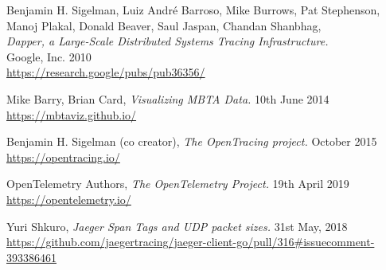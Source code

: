\documentclass[12pt,pdftex,titlepage]{report}
\begin{document}
    \begin{thebibliography}{69}

        Benjamin H. Sigelman, Luiz André Barroso, Mike Burrows, Pat Stephenson, Manoj Plakal, Donald Beaver, Saul Jaspan, Chandan Shanbhag, \\
        \textit{Dapper, a Large-Scale Distributed Systems Tracing Infrastructure.} \\
        Google, Inc. 2010 \\
        \url{https://research.google/pubs/pub36356/}

        Mike Barry, Brian Card, \textit{Visualizing MBTA Data.}
        10th June 2014 \\
        \url{https://mbtaviz.github.io/}

        Benjamin H. Sigelman (co creator), \textit{The OpenTracing project.}
        October 2015 \\
        \url{https://opentracing.io/}

        OpenTelemetry Authors, \textit{The OpenTelemetry Project.} 
        19th April 2019 \\
        \url{https://opentelemetry.io/}

        Yuri Shkuro, \textit{Jaeger Span Tags and UDP packet sizes.}
        31st May, 2018 \\
        \url{https://github.com/jaegertracing/jaeger-client-go/pull/316#issuecomment-393386461}
    \end{thebibliography}
\end{document}
